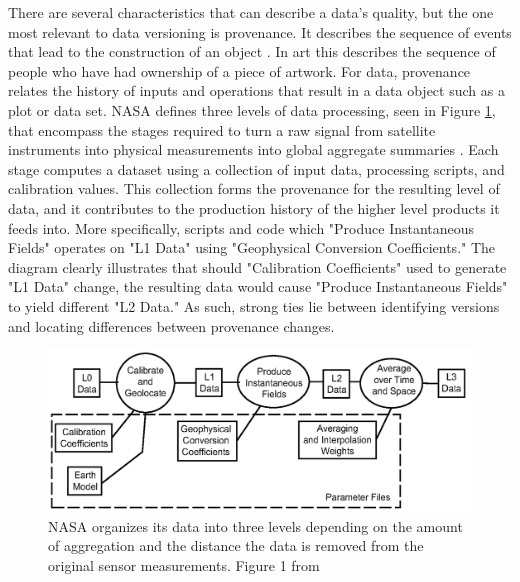 There are several characteristics that can describe a data's quality, but the one most relevant to data versioning is provenance.
It describes the sequence of events that lead to the construction of an object  \cite{dai2014provenance}.
In art this describes the sequence of people who have had ownership of a piece of artwork.
For data, provenance relates the history of inputs and operations that result in a data object such as a plot or data set.
NASA defines three levels of data processing, seen in Figure \ref{NASALevels}, that encompass the stages required to turn a raw signal from satellite instruments into physical measurements into global aggregate summaries \cite{Barkstrom2003}.
Each stage computes a dataset using a collection of input data, processing scripts, and calibration values.
This collection forms the provenance for the resulting level of data, and it contributes to the production history of the higher level products it feeds into.
More specifically, scripts and code which "Produce Instantaneous Fields" operates on "L1 Data" using "Geophysical Conversion Coefficients."
The diagram clearly illustrates that should "Calibration Coefficients" used to generate "L1 Data" change, the resulting data would cause "Produce Instantaneous Fields" to yield different "L2 Data."
As such, strong ties lie between identifying versions and locating differences between provenance changes.

\begin{figure}
	\centering
	\includegraphics[scale=0.40]{figures/NASALevels.png}
	\caption{NASA organizes its data into three levels depending on the amount of aggregation and the distance the data is removed from the original sensor measurements. Figure 1 from \cite{Barkstrom2003}}
	\label{NASALevels}
\end{figure}

